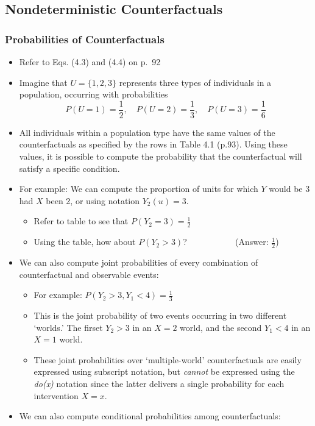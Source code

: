 \documentclass[]{article}
\providecommand{\tightlist}{%
  \setlength{\itemsep}{0pt}\setlength{\parskip}{0pt}}
\begin{document}
\subsection{Nondeterministic
Counterfactuals}\label{nondeterministic-counterfactuals}

\subsubsection{Probabilities of
Counterfactuals}\label{probabilities-of-counterfactuals}

\begin{itemize}
\item
  Refer to Eqs. (4.3) and (4.4) on p.~92
\item
  Imagine that \(U = \{1, 2, 3\}\) represents three types of individuals
  in a population, occurring with probabilities
  \[P(U = 1) = \frac{1}{2}, \quad P(U = 2) = \frac{1}{3}, \quad P(U = 3) = \frac{1}{6}\]
\item
  All individuals within a population type have the same values of the
  counterfactuals as specified by the rows in Table 4.1 (p.93). Using
  these values, it is possible to compute the probability that the
  counterfactual will satisfy a specific condition.
\item
  For example: We can compute the proportion of units for which \(Y\)
  would be 3 had \(X\) been 2, or using notation \(Y_2(u) = 3\).

  \begin{itemize}
  \tightlist
  \item
    Refer to table to see that \(P(Y_2 = 3) = \frac{1}{2}\)
  \item
    Using the table, how about \(P(Y_2 > 3)\)?
    \(\quad \quad \quad \quad \quad\) (Answer: \(\frac{1}{2}\))
  \end{itemize}
\item
  We can also compute joint probabilities of every combination of
  counterfactual and observable events:

  \begin{itemize}
  \tightlist
  \item
    For example: \(P(Y_2 > 3, Y_1 < 4) = \frac{1}{3}\)
  \item
    This is the joint probability of two events occurring in two
    different `worlds.' The firset \(Y_2 > 3\) in an \(X = 2\) world,
    and the second \(Y_1 < 4\) in an \(X = 1\) world.
  \item
    These joint probabilities over `multiple-world' counterfactuals are
    easily expressed using subscript notation, but \emph{cannot} be
    expressed using the \emph{do(x)} notation since the latter delivers
    a single probability for each intervention \(X = x\).
  \end{itemize}
\item
  We can also compute conditional probabilities among counterfactuals:


\end{itemize}
\end{document}
